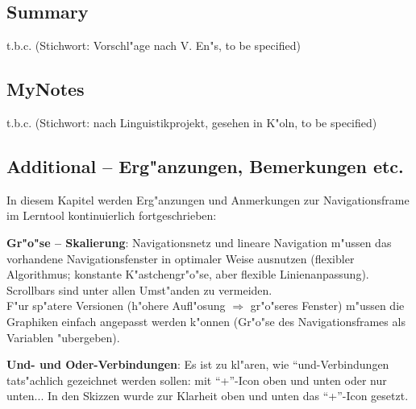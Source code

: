\clearpage

\subsection{Summary}\label{Summanry}

t.b.c. 	(Stichwort: Vorschl"age nach V. En"s, to be specified)

\clearpage

\subsection{MyNotes}\label{my_notes}

t.b.c.	(Stichwort: nach Linguistikprojekt, gesehen in K"oln, to be specified)

\clearpage

\subsection{Additional -- Erg"anzungen, Bemerkungen etc.}\label{additional}

In diesem Kapitel werden Erg"anzungen und Anmerkungen zur
Navigationsframe im Lerntool kontinuierlich fortgeschrieben:

\begin{list_sabina}
        \item \textbf{Gr"o"se -- Skalierung}: 
	Navigationsnetz und lineare Navigation m"ussen das vorhandene
	Navigationsfenster in optimaler Weise ausnutzen (flexibler
	Algorithmus; konstante K"astchengr"o"se, aber flexible
	Linienanpassung).
	Scrollbars sind unter allen Umst"anden zu vermeiden.\\
	F"ur sp"atere Versionen (h"ohere Aufl"osung $\Rightarrow$
	gr"o"seres Fenster) m"ussen die Graphiken einfach angepasst
	werden k"onnen
	(Gr"o"se des Navigationsframes als Variablen "ubergeben).
        \item \textbf{Und- und Oder-Verbindungen}: 
	Es ist zu kl"aren, wie ``und-Verbindungen tats"achlich gezeichnet
	werden sollen: mit ``+''-Icon oben und unten oder nur unten...
	In den Skizzen wurde zur Klarheit oben und unten das ``+''-Icon 
	gesetzt.
\end{list_sabina}




